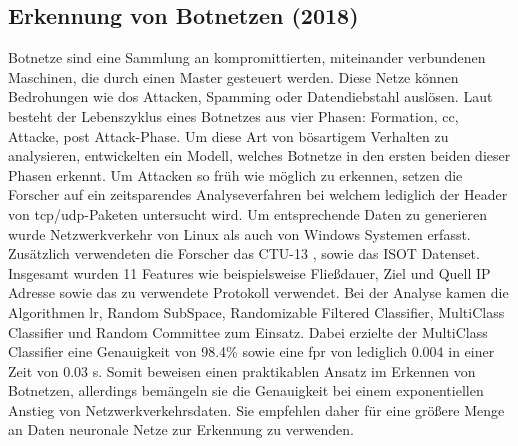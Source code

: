 \documentclass[
    12pt, %
    DIV10,
    ngerman, %
    a4paper, %
    oneside, %
    titlepage, %
    parskip=half, %
    headings=normal, %
    listof=totoc, %
    bibliography=totoc, %
    index=totoc, %
    captions=tableheading, %
    final %
]{scrreprt}
\begin{document}
\subsection{Erkennung von Botnetzen (2018)}\label{ctu}
Botnetze sind eine Sammlung an kompromittierten, miteinander verbundenen Maschinen, die durch einen Master gesteuert werden. Diese Netze können Bedrohungen wie \ac{dos} Attacken, Spamming oder Datendiebstahl auslösen. Laut \textcite{leonard2009framework} besteht der Lebenszyklus eines Botnetzes aus vier Phasen: Formation, \ac{cc}, Attacke, post Attack-Phase. Um diese Art von bösartigem Verhalten zu analysieren, entwickelten \textcite{Mathur2018} ein Modell, welches Botnetze in den ersten beiden dieser Phasen erkennt. Um Attacken so früh wie möglich zu erkennen, setzen die Forscher auf ein zeitsparendes Analyseverfahren bei welchem lediglich der Header von \ac{tcp}/\ac{udp}-Paketen untersucht wird. Um entsprechende Daten zu generieren wurde Netzwerkverkehr von Linux als auch von Windows Systemen erfasst. Zusätzlich verwendeten die Forscher das CTU-13 \parencite{garcia2014empirical}, sowie das ISOT \parencite{isot} Datenset. Insgesamt wurden 11 Features wie beispielsweise Fließdauer, Ziel und Quell IP Adresse sowie das zu verwendete Protokoll verwendet. Bei der Analyse kamen die Algorithmen \ac{lr}, Random SubSpace, Randomizable Filtered Classifier, MultiClass Classifier und Random Committee zum Einsatz. Dabei erzielte der MultiClass Classifier eine Genauigkeit von 98.4\% sowie eine \ac{fpr} von lediglich 0.004 in einer Zeit von 0.03 s. Somit beweisen \textcite{Mathur2018} einen praktikablen Ansatz im Erkennen von Botnetzen, allerdings bemängeln sie die Genauigkeit bei einem exponentiellen Anstieg von Netzwerkverkehrsdaten. Sie empfehlen daher für eine größere Menge an Daten neuronale Netze zur Erkennung zu verwenden.
%
\end{document}
